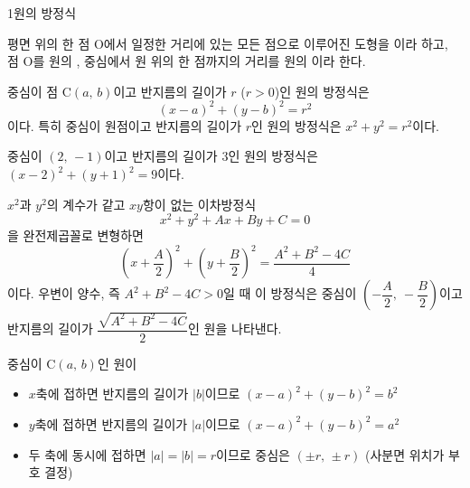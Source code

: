 \documentclass[10pt]{article}
\begin{document}

\begin{dmconcept}{1}{원의 방정식}
\setlength{\parskip}{1.4mm plus 1.6mm minus 0mm}\linespread{1.22}\selectfont%


평면 위의 한 점 $\mathrm{O}$에서 일정한 거리에 있는 모든 점으로 이루어진 도형을 이라 하고, 점 $\mathrm{O}$를 원의 , 중심에서 원 위의 한 점까지의 거리를 원의 이라 한다.


중심이 점 $\mathrm{C}(a,\, b)$이고 반지름의 길이가 $r$ ($r > 0$)인 원의 방정식은
\begin{equation*}
  (x - a)^2 + (y - b)^2 = r^2
\end{equation*}
이다. 특히 중심이 원점이고 반지름의 길이가 $r$인 원의 방정식은 $x^2 + y^2 = r^2$이다.

\begin{dmexample}
중심이 $(2,\, -1)$이고 반지름의 길이가 $3$인 원의 방정식은 $(x - 2)^2 + (y + 1)^2 = 9$이다.
\end{dmexample}


$x^2$과 $y^2$의 계수가 같고 $xy$항이 없는 이차방정식
\begin{equation*}
  x^2 + y^2 + Ax + By + C = 0
\end{equation*}
을 완전제곱꼴로 변형하면
\begin{equation*}
  \left(x + \frac{A}{2}\right)^2 + \left(y + \frac{B}{2}\right)^2 = \frac{A^2 + B^2 - 4C}{4}
\end{equation*}
이다. 우변이 양수, 즉 $A^2 + B^2 - 4C > 0$일 때 이 방정식은 중심이 $\left(-\dfrac{A}{2},\ -\dfrac{B}{2}\right)$이고 반지름의 길이가 $\dfrac{\sqrt{A^2 + B^2 - 4C}}{2}$인 원을 나타낸다.


중심이 $\mathrm{C}(a,\, b)$인 원이
\begin{itemize}[leftmargin=8mm, itemsep=0.5mm, topsep=1mm]
  \item $x$축에 접하면 반지름의 길이가 $|b|$이므로 $(x-a)^2 + (y-b)^2 = b^2$
  \item $y$축에 접하면 반지름의 길이가 $|a|$이므로 $(x-a)^2 + (y-b)^2 = a^2$
  \item 두 축에 동시에 접하면 $|a| = |b| = r$이므로 중심은 $(\pm r,\, \pm r)$ (사분면 위치가 부호 결정)
\end{itemize}

\end{dmconcept}
\end{document}

